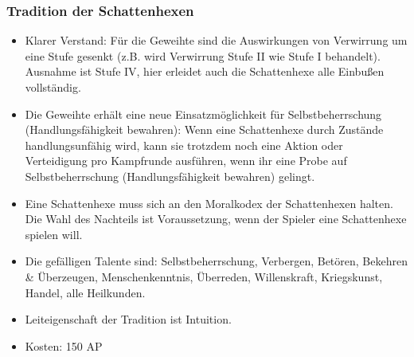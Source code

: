 \documentclass[9pt]{article}
\begin{document}
\begin{shaded*}
	\subsubsection{Tradition der Schattenhexen}
	\begin{itemize}
		\item Klarer Verstand: Für die Geweihte sind die Auswirkungen von Verwirrung um eine Stufe gesenkt (z.B. wird Verwirrung Stufe II wie Stufe I behandelt). Ausnahme ist Stufe IV, hier erleidet auch die Schattenhexe alle Einbußen vollständig. 
		\item Die Geweihte erhält eine neue Einsatzmöglichkeit für Selbstbeherrschung (Handlungsfähigkeit bewahren): Wenn eine Schattenhexe durch Zustände handlungsunfähig wird, kann sie trotzdem noch eine Aktion oder Verteidigung pro Kampfrunde ausführen, wenn ihr eine Probe auf Selbstbeherrschung (Handlungsfähigkeit bewahren) gelingt.
		\item Eine Schattenhexe muss sich an den Moralkodex der Schattenhexen halten. Die Wahl des Nachteils ist Voraussetzung, wenn der Spieler eine Schattenhexe spielen will.
		\item Die gefälligen Talente sind: Selbstbeherrschung, Verbergen, Betören, Bekehren \& Überzeugen, Menschenkenntnis, Überreden, Willenskraft, Kriegskunst, Handel, alle Heilkunden.
		\item Leiteigenschaft der Tradition ist Intuition.
		\item[] Kosten: 150 AP
	\end{itemize}
\end{shaded*}
%
\end{document}
